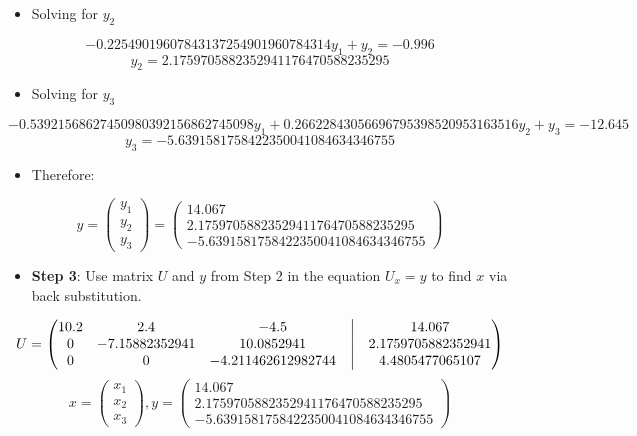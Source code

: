 \documentclass[
]{article}
\providecommand{\tightlist}{%
  \setlength{\itemsep}{0pt}\setlength{\parskip}{0pt}}
\begin{document}
\begin{itemize}
\tightlist
\item
  Solving for \(y_{2}\)
\end{itemize}

\[-0.22549019607843137254901960784314y_{1} + y_{2} = -0.996\]
\[y_{2} = 2.1759705882352941176470588235295\]

\begin{itemize}
\tightlist
\item
  Solving for \(y_{3}\)
\end{itemize}

\[-0.53921568627450980392156862745098y_{1} + 0.26622843056696795398520953163516y_{2} + y_{3} = -12.645\]
\[y_{3} = -5.6391581758422350041084634346755\]

\begin{itemize}
\tightlist
\item
  Therefore:
\end{itemize}

\[
    y = 
    \begin{pmatrix}
      y_{1} \\
      y_{2} \\
      y_{3} 
    \end{pmatrix}
    = 
    \begin{pmatrix}
      14.067 \\
      2.1759705882352941176470588235295 \\
      -5.6391581758422350041084634346755 
    \end{pmatrix}
   \]

\begin{itemize}
\tightlist
\item
  \textbf{Step 3}: Use matrix \(U\) and \(y\) from Step 2 in the
  equation \(U_{x} = y\) to find \(x\) via back substitution.
\end{itemize}

\[
   U =
   \begin{pmatrix}
    10.2 & 2.4 & -4.5  &\bigm| & 14.067 \\
    0 & -7.15882352941 & 10.0852941  &\bigm| & 2.1759705882352941 \\
    0 & 0 & -4.211462612982744  &\bigm| & 4.4805477065107 
    \end{pmatrix}
   \] \[
   x = 
   \begin{pmatrix}
    x_{1} \\
    x_{2} \\
    x_{3} 
   \end{pmatrix}
   ,
   y = 
   \begin{pmatrix}
      14.067 \\
      2.1759705882352941176470588235295 \\
      -5.6391581758422350041084634346755 
    \end{pmatrix}
   \]
\end{document}
